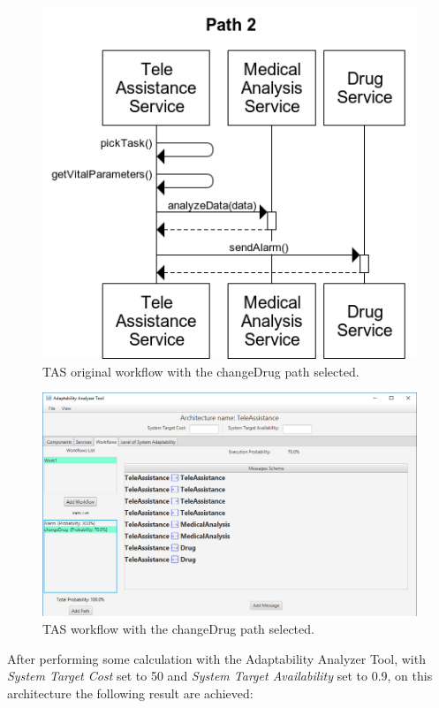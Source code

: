 \begin{figure}[ht]
	\centerline
	{\includegraphics[scale=0.55]{img/TeleAssistanceOrigPath2.png}}
	\caption[TAS Original Workflow Path Alarm]{TAS original workflow with the changeDrug path selected.}
	\label{fig:tas-or-path2}
\end{figure}

\begin{figure}[ht]
	\centerline
	{\includegraphics[scale=0.55]{img/TeleAssistancePath2.png}}
	\caption[TAS Workflow Path changeDrug]{TAS workflow with the changeDrug path selected.}
	\label{fig:tas-path2}
\end{figure}

\clearpage

After performing some calculation with the Adaptability Analyzer Tool, with \emph{System Target Cost} set to 50 and \emph{System Target Availability} set to 0.9, on this architecture the following result are achieved:


